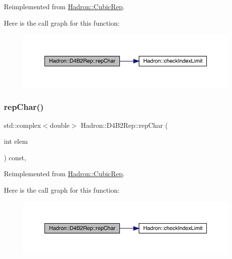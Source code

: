 Reimplemented from \mbox{\hyperlink{structHadron_1_1CubicRep_af45227106e8e715e84b0af69cd3b36f8}{Hadron\+::\+Cubic\+Rep}}.

Here is the call graph for this function\+:
\nopagebreak
\begin{figure}[H]
\begin{center}
\leavevmode
\includegraphics[width=350pt]{d0/d07/structHadron_1_1D4B2Rep_a23d3d1b8d91d37f5d2c70f3ea7950ab7_cgraph}
\end{center}
\end{figure}
\mbox{\label{structHadron_1_1D4B2Rep_a23d3d1b8d91d37f5d2c70f3ea7950ab7}} 
\subsubsection{\texorpdfstring{repChar()}{repChar()}\hspace{0.1cm}{\footnotesize\ttfamily [3/3]}}
{\footnotesize\ttfamily std\+::complex$<$double$>$ Hadron\+::\+D4\+B2\+Rep\+::rep\+Char (\begin{DoxyParamCaption}\item[{int}]{elem }\end{DoxyParamCaption}) const\hspace{0.3cm}{\ttfamily [inline]}, {\ttfamily [virtual]}}



Reimplemented from \mbox{\hyperlink{structHadron_1_1CubicRep_af45227106e8e715e84b0af69cd3b36f8}{Hadron\+::\+Cubic\+Rep}}.

Here is the call graph for this function\+:
\nopagebreak
\begin{figure}[H]
\begin{center}
\leavevmode
\includegraphics[width=350pt]{d0/d07/structHadron_1_1D4B2Rep_a23d3d1b8d91d37f5d2c70f3ea7950ab7_cgraph}
\end{center}
\end{figure}
\mbox{\label{structHadron_1_1D4B2Rep_a245244df26be686b405786bd1df4627e}} 
